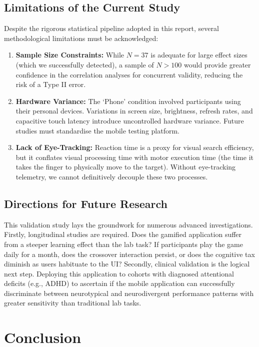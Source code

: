 \documentclass[11pt,a4paper]{article}
\begin{document}
\subsection{Limitations of the Current Study}
Despite the rigorous statistical pipeline adopted in this report, several methodological limitations must be acknowledged:
\begin{enumerate}
    \item \textbf{Sample Size Constraints:} While $N=37$ is adequate for large effect sizes (which we successfully detected), a sample of $N > 100$ would provide greater confidence in the correlation analyses for concurrent validity, reducing the risk of a Type II error.
    \item \textbf{Hardware Variance:} The `Phone' condition involved participants using their personal devices. Variations in screen size, brightness, refresh rates, and capacitive touch latency introduce uncontrolled hardware variance. Future studies must standardise the mobile testing platform.
    \item \textbf{Lack of Eye-Tracking:} Reaction time is a proxy for visual search efficiency, but it conflates visual processing time with motor execution time (the time it takes the finger to physically move to the target). Without eye-tracking telemetry, we cannot definitively decouple these two processes.
\end{enumerate}

\subsection{Directions for Future Research}
This validation study lays the groundwork for numerous advanced investigations. 
Firstly, longitudinal studies are required. Does the gamified application suffer from a steeper learning effect than the lab task? If participants play the game daily for a month, does the crossover interaction persist, or does the cognitive tax diminish as users habituate to the UI?
Secondly, clinical validation is the logical next step. Deploying this application to cohorts with diagnosed attentional deficits (e.g., ADHD) to ascertain if the mobile application can successfully discriminate between neurotypical and neurodivergent performance patterns with greater sensitivity than traditional lab tasks.

\section{Conclusion}
\label{sec:conclusion}
\end{document}
